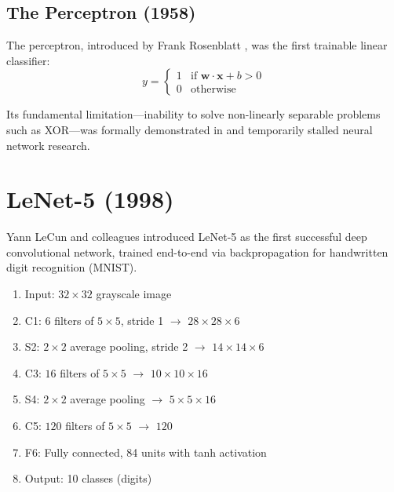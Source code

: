 \subsection{The Perceptron (1958)}

The perceptron, introduced by Frank Rosenblatt \cite{rosenblatt1958perceptron}, was the first trainable linear classifier:
\begin{equation}
y = \begin{cases} 1 & \text{if } \mathbf{w} \cdot \mathbf{x} + b > 0 \\ 0 & \text{otherwise} \end{cases}
\end{equation}

Its fundamental limitation---inability to solve non-linearly separable problems such as XOR---was formally demonstrated in \cite{minsky1969perceptrons} and temporarily stalled neural network research.

\section{LeNet-5 (1998)}

Yann LeCun and colleagues introduced LeNet-5 \cite{lecun1998gradient} as the first successful deep convolutional network, trained end-to-end via backpropagation for handwritten digit recognition (MNIST).

\begin{architecture}
\begin{enumerate}
    \item Input: $32\times32$ grayscale image
    \item C1: $6$ filters of $5\times5$, stride 1 $\rightarrow$ $28\times28\times6$
    \item S2: $2\times2$ average pooling, stride 2 $\rightarrow$ $14\times14\times6$
    \item C3: $16$ filters of $5\times5$ $\rightarrow$ $10\times10\times16$
    \item S4: $2\times2$ average pooling $\rightarrow$ $5\times5\times16$
    \item C5: $120$ filters of $5\times5$ $\rightarrow$ $120$
    \item F6: Fully connected, 84 units with tanh activation
    \item Output: 10 classes (digits)
\end{enumerate}
\end{architecture}

